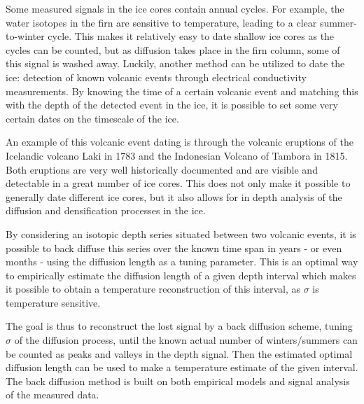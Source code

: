 \documentclass[../../CompleteThesis2/Complete_2ndDraft]{subfiles}
\begin{document}
	Some measured signals in the ice cores contain annual cycles. For example, the water isotopes in the firn are sensitive to temperature, leading to a clear summer-to-winter cycle. This makes it relatively easy to date shallow ice cores as the cycles can be counted, but as diffusion takes place in the firn column, some of this signal is washed away. Luckily, another method can be utilized to date the ice: detection of known volcanic events through electrical conductivity measurements. By knowing the time of a certain volcanic event and matching this with the depth of the detected event in the ice, it is possible to set some very certain dates on the timescale of the ice. 
	
	An example of this volcanic event dating is through the volcanic eruptions of the Icelandic volcano Laki in 1783 and the Indonesian Volcano of Tambora in 1815. Both eruptions are very well historically documented and are visible and detectable in a great number of ice cores. This does not only make it possible to generally date different ice cores, but it also allows for in depth analysis of the diffusion and densification processes in the ice. 
	
	By considering an isotopic depth series situated between two volcanic events, it is possible to back diffuse this series over the known time span in years - or even months - using the diffusion length as a tuning parameter. This is an optimal way to empirically estimate the diffusion length of a given depth interval which makes it possible to obtain a temperature reconstruction of this interval, as $\sigma$ is temperature sensitive.
	
	The goal is thus to reconstruct the lost signal by a back diffusion scheme, tuning $\sigma$ of the diffusion process, until the known actual number of winters/summers can be counted as peaks and valleys in the depth signal. Then the estimated optimal diffusion length can be used to make a temperature estimate of the given interval.
	The back diffusion method is built on both empirical models and signal analysis of the measured data.
	
\end{document}
